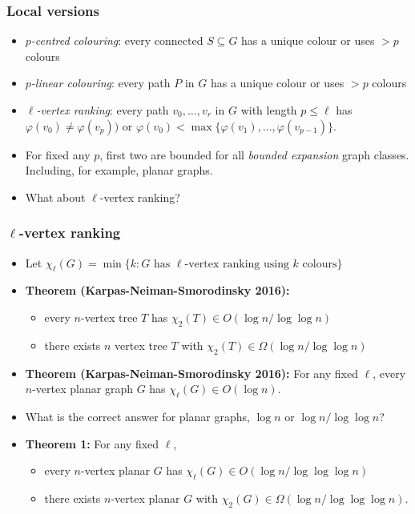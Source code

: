 \documentclass[xcolor=dvipsnames]{beamer}
\begin{document}
\begin{frame}
  \frametitle{Local versions}

  \begin{itemize}
    \item \emph{$p$-centred colouring}: every connected $S\subseteq G$ has a unique colour or uses $>\!\!p$ colours
    
    \item \emph{$p$-linear colouring}: every path $P$ in $G$ has a unique colour or uses $>\!\!p$ colours
    
    \item \emph{$\ell$-vertex ranking}: every path $v_0,\ldots,v_r$ in $G$ with length $p\le\ell$ has $\varphi(v_0)\neq\varphi(v_p))$ or $\varphi(v_0)<\max\{\varphi(v_1),\ldots,\varphi(v_{p-1})\}$.
    
    \item For fixed any $p$, first two are bounded for all \emph{bounded expansion} graph classes. Including, for example, planar graphs.
    
    \item What about $\ell$-vertex ranking?
  \end{itemize}
\end{frame}

\begin{frame}
  \frametitle{$\ell$-vertex ranking}
  
  \begin{itemize}
    \item Let $\chi_\ell(G)=\min\{k:\mbox{$G$ has $\ell$-vertex ranking using $k$ colours}\}$  
    
    \item<2->[]\textbf{Theorem (Karpas-Neiman-Smorodinsky 2016):} 
    \begin{itemize}
      \item every $n$-vertex tree $T$ has $\chi_2(T)\in O(\log n/\log\log n)$
      \item there exists $n$ vertex tree $T$ with $\chi_2(T)\in\Omega(\log n/\log\log n)$
    \end{itemize}
    
    \item<3->[]\textbf{Theorem (Karpas-Neiman-Smorodinsky 2016):} For any fixed $\ell$, every $n$-vertex planar graph $G$ has $\chi_\ell(G)\in O(\log n)$.
    
    \item<4->What is the correct answer for planar graphs, $\log n$ or $\log n/\log\log n$?
    
    \item<5->[]\textbf{Theorem 1: } For any fixed $\ell$, 
    \begin{itemize} 
      \item every $n$-vertex planar $G$ has $\chi_\ell(G)\in O(\log n/\log\log\log n)$
      \item there exists $n$-vertex planar $G$ with $\chi_2(G)\in\Omega(\log n/\log\log\log n)$.
    \end{itemize}
  \end{itemize}
\end{frame}
\end{document}
